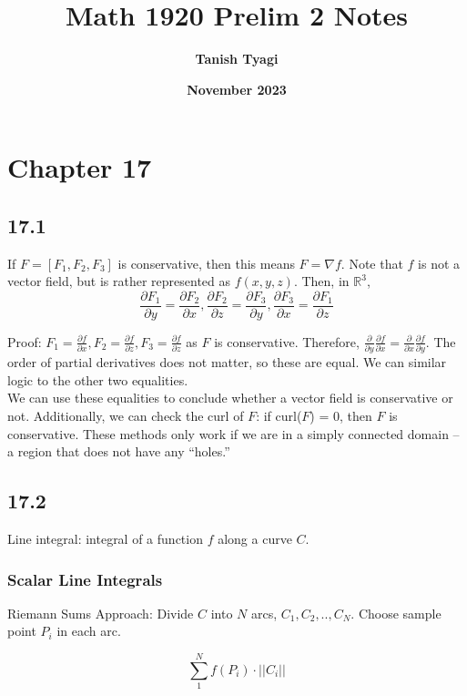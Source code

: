 \documentclass{article}
\title{\textbf{Math 1920 Prelim 2 Notes}}
\author{\textbf{Tanish Tyagi}}
\date{\textbf{November 2023}}
\begin{document}
\maketitle

\section{Chapter 17}

\subsection{17.1}

If $F = [F_1, F_2, F_3]$ is conservative, then this means $F= \nabla f$. Note that $f$ is not a vector field, but is rather represented as $f(x,y,z)$. Then, in $\mathbb{R}^3$, $$\frac{\partial F_1}{\partial y} = \frac{\partial F_2}{\partial x}, \frac{\partial F_2}{\partial z} = \frac{\partial F_3}{\partial y}, \frac{\partial F_3}{\partial x} = \frac{\partial F_1}{\partial z}$$

Proof: $F_1 = \frac{\partial f}{\partial x}, F_2 = \frac{\partial f}{\partial z}, F_3 = \frac{\partial f}{\partial z}$ as $F$ is conservative. Therefore, $\frac{\partial}{\partial y} \frac{\partial f}{\partial x} = \frac{\partial}{\partial x} \frac{\partial f}{\partial y}$. The order of partial derivatives does not matter, so these are equal. We can similar logic to the other two equalities. \\

We can use these equalities to conclude whether a vector field is conservative or not. Additionally, we can check the curl of $F$: if curl($F$) = 0, then $F$ is conservative. These methods only work if we are in a simply connected domain -- a region that does not have any “holes.”

\subsection{17.2}

Line integral: integral of a function $f$ along a curve $C$.

\subsubsection{Scalar Line Integrals}

Riemann Sums Approach: 
Divide $C$ into $N$ arcs, $C_1, C_2,..,C_N$. Choose sample point $P_i$ in each arc.

$$
\sum_{1}^{N} f(P_i) \cdot ||C_i||
$$
\end{document}
